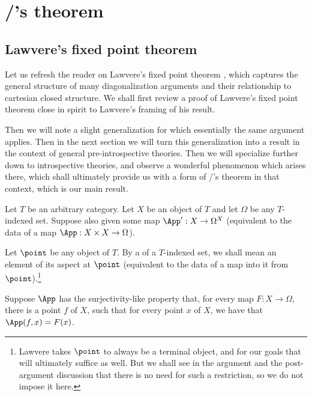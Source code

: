 \filestart

\section{\Loeb/'s theorem}

\subsection{Lawvere's fixed point theorem}
Let us refresh the reader on Lawvere's fixed point theorem \autocite{lawvere1969diagonal}, which captures the general structure of many diagonalization arguments and their relationship to cartesian closed structure. We shall first review a proof of Lawvere's fixed point theorem close in spirit to Lawvere's framing of his result.

Then we will note a slight generalization for which essentially the same argument applies. Then in the next section we will turn this generalization into a result in the context of general pre-introspective theories. Then we will specialize further down to introspective theories, and observe a wonderful  phenomenon which arises there, which shall ultimately provide us with a form of \Loeb/'s theorem in that context, which is our main result.

\label{LawveresFixedPointTheorem}
Let $T$ be an arbitrary category. Let $X$ be an object of $T$ and let $\Omega$ be any $T$-indexed set. Suppose also given some map $\App' : X \to \Omega^X$ (equivalent to the data of a map $\App : X \times X \to \Omega$).

Let $\point$ be any object of $T$. By a  of a $T$-indexed set, we shall mean an element of its aspect at $\point$ (equivalent to the data of a map into it from $\point$).\footnote{Lawvere takes $\point$ to always be a terminal object, and for our goals that will ultimately suffice as well. But we shall see in the argument and the post-argument discussion that there is no need for such a restriction, so we do not impose it here.}

Suppose $\App$ has the surjectivity-like property that, for every map $F : X \to \Omega$, there is a point $f$ of $X$, such that for every point $x$ of $X$, we have that $\App(f, x) = F(x)$.

